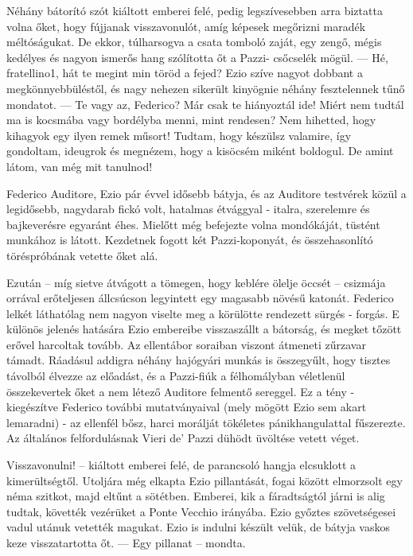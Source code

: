 \documentclass{thesis-ekf}
\theoremstyle{definition}
\theoremstyle{remark}
\begin{document}
Néhány  bátorító  szót  kiáltott  emberei  felé,  pedig 
legszívesebben arra biztatta volna őket, hogy fújjanak visszavonulót, 
amíg  képesek  megőrizni  maradék  méltóságukat.  De  ekkor, 
túlharsogva  a  csata  tomboló  zaját,  egy  zengő,  mégis  kedélyes  és 
nagyon ismerős hang szólította őt a Pazzi- csőcselék mögül. 
— Hé, fratellino1, hát te megint min töröd a fejed? 
Ezio szíve nagyot dobbant a megkönnyebbüléstől, és nagy nehezen 
sikerült kinyögnie néhány fesztelennek tűnő mondatot. 
— Te vagy az, Federico? Már csak te hiányoztál ide! Miért nem 
tudtál ma is kocsmába vagy bordélyba menni, mint rendesen? 
Nem hihetted, hogy kihagyok egy ilyen remek műsort! Tudtam, 
hogy  készülsz  valamire,  így  gondoltam,  ideugrok  és  megnézem, 
hogy a kisöcsém  miként boldogul. De amint  látom,  van  még  mit 
tanulnod! 

Federico Auditore, Ezio pár évvel idősebb bátyja, és az Auditore 
testvérek  közül  a  legidősebb,  nagydarab  fickó  volt,  hatalmas 
étvággyal - italra, szerelemre és bajkeverésre egyaránt éhes. Mielőtt 
még  befejezte  volna  mondókáját,  tüstént  munkához  is  látott. 
Kezdetnek  fogott  két  Pazzi-koponyát,  és  összehasonlító 
töréspróbának  vetette  őket  alá.  

Ezután  --  míg  sietve  átvágott  a tömegen, hogy keblére ölelje öccsét -- csizmája orrával erőteljesen állcsúcson legyintett egy magasabb növésű katonát. Federico lelkét láthatólag  nem  nagyon  viselte  meg  a  körülötte  rendezett  sürgés - forgás. E különös  jelenés  hatására  Ezio  embereibe  visszaszállt  a bátorság,  és  megket tőzött  erővel  harcoltak  tovább.  Az  ellentábor soraiban viszont átmeneti zűrzavar támadt. Ráadásul addigra néhány 
hajógyári  munkás  is  összegyűlt,  hogy  tisztes  távolból  élvezze  az 
előadást,  és  a  Pazzi-fiúk  a  félhomályban  véletlenül  összekevertek 
őket  a  nem  létező  Auditore  felmentő  sereggel.  Ez  a  tény  - 
kiegészítve Federico további mutatványaival (mely mögött Ezio sem 
akart  lemaradni) - az  ellenfél  bősz,  harci  morálját  tökéletes 
pánikhangulattal fűszerezte. 
Az általános felfordulásnak Vieri de' Pazzi dühödt üvöltése vetett véget. 

Visszavonulni! -- kiáltott  emberei  felé,  de  parancsoló  hangja 
elcsuklott  a  kimerültségtől.  Utoljára  még  elkapta  Ezio  pillantását, 
fogai  között  elmorzsolt  egy  néma  szitkot,  majd  eltűnt  a  sötétben.  
Emberei, kik a fáradtságtól járni is alig tudtak, követték vezérüket a 
Ponte  Vecchio  irányába.  Ezio  győztes  szövetségesei  vadul  utánuk 
vetették magukat. 
Ezio is indulni készült velük, de bátyja vaskos keze visszatartotta 
őt. — Egy pillanat -- mondta.
\end{document}
